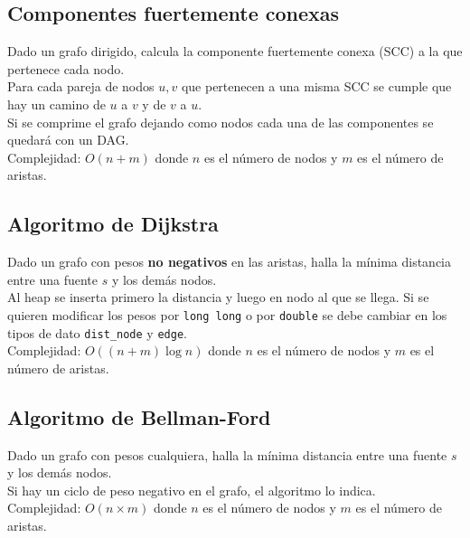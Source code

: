 \documentclass[10pt,letterpaper,twocolumn]{article}
\newcommand{\source}[1]{
	
	\dotfill
}
\begin{document}
	\subsection{Componentes fuertemente conexas}
		Dado un grafo dirigido, calcula la componente fuertemente conexa (SCC) a la que pertenece cada nodo.\\
		Para cada pareja de nodos $u, v$ que pertenecen a una misma SCC se cumple que hay un camino de $u$ a $v$ y de $v$ a $u$.\\
		Si se comprime el grafo dejando como nodos cada una de las componentes se quedará con un DAG.\\
		Complejidad: $O(n+m)$ donde $n$ es el número de nodos y $m$ es el número de aristas.\\
		\source{./src/componentes_conexas.cpp}
	
	\subsection{Algoritmo de Dijkstra}
		Dado un grafo con pesos \textbf{no negativos} en las aristas, halla la mínima distancia entre una fuente $s$ y los demás nodos.\\
		Al heap se inserta primero la distancia y luego en nodo al que se llega. Si se quieren modificar los pesos por \verb|long long| o por \verb|double| se debe cambiar en los tipos de dato \verb|dist_node| y \verb|edge|.\\
		Complejidad: $O((n+m) \operatorname{log} n)$ donde $n$ es el número de nodos y $m$ es el número de aristas.\\
		\source{./src/dijkstra.cpp}
		
	\subsection{Algoritmo de Bellman-Ford}
		Dado un grafo con pesos cualquiera, halla la mínima distancia entre una fuente $s$ y los demás nodos.\\
		Si hay un ciclo de peso negativo en el grafo, el algoritmo lo indica.\\
		Complejidad: $O(n \times m)$ donde $n$ es el número de nodos y $m$ es el número de aristas.\\
		\source{./src/bellman_ford.cpp}
	
\end{document}

